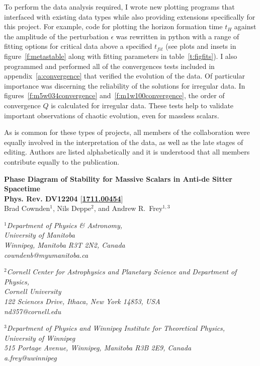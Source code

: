 \documentclass[../PhD.tex]{subfiles}
\begin{document}
To perform the data analysis required, I wrote new plotting programs that interfaced with existing data types while also providing extensions specifically for this project. For example, code for plotting the horizon formation time $t_H$ against the amplitude of the perturbation $\epsilon$ was rewritten in python with a range of fitting options for critical data above a specified $t_{fit}$ (see plots and insets in figure~\ref{f:metastable} along with fitting parameters in table~\ref{t:figfits}). I also programmed and performed all of the convergences tests included in appendix~\ref{a:convergence} that verified the evolution of the data. Of particular importance was discerning the reliability of the solutions for irregular data. In figures~\ref{f:m5w034convergence} and~\ref{f:m1w100convergence}, the order of convergence $Q$ is calculated for irregular data. These tests help to validate important observations of chaotic evolution, even for massless scalars.

As is common for these types of projects, all members of the collaboration were equally involved in the interpretation of the data, as well as the late stages of editing. Authors are listed alphabetically and it is understood that all members contribute equally to the publication.

\newpage


\begin{center}
{\bf{\Large Phase Diagram of Stability for Massive Scalars in Anti-de Sitter
Spacetime}} \\
\bigskip
{\bf Phys. Rev. DV12204 $\big[$\href{https://arxiv.org/abs/1711.00454}{1711.00454}$\big]$ } \\
\bigskip
\bigskip
Brad Cownden$^1$, Nils Deppe$^2$, and Andrew R.~Frey$^{1,3}$\\
\bigskip

$^1${\it Department of Physics \& Astronomy,\\ University of Manitoba\\
Winnipeg, Manitoba R3T 2N2, Canada \\ {\rm cowndenb@myumanitoba.ca}} \\
\vspace{0.1in}

$^2${\it Cornell Center for Astrophysics and Planetary Science and
Department of Physics,\\ Cornell University\\
122 Sciences Drive, Ithaca, New York 14853, USA \\ {\rm nd357@cornell.edu}} \\
\vspace{0.1in}

$^3${\it Department of Physics and Winnipeg Institute for Theoretical
Physics,\\ University of Winnipeg\\
515 Portage Avenue, Winnipeg, Manitoba R3B 2E9, Canada \\ {\rm a.frey@uwinnipeg}}
\end{center}
\end{document}
